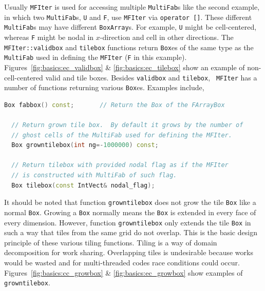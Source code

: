 {{{Usually {\tt MFIter} is used for accessing multiple {\tt MultiFab}s
like the second example, in which two {\tt MultiFab}s, {\tt U} and
{\tt F}, use {\tt MFIter} via {\tt operator []}.  These different {\tt
  MultiFab}s may have different {\tt BoxArray}s.  For example, {\tt U}
might be cell-centered, whereas {\tt F} might be nodal in
$x$-direction and cell in other directions.  The {\tt
  MFIter::validbox} and {\tt tilebox} functions return {\tt Box}es of
the same type as the {\tt MultiFab} used in defining the {\tt MFIter}
({\tt F} in this example).  Figures~\ref{fig:basics:ec_validbox} \&
\ref{fig:basics:ec_tilebox} show an example of non-cell-centered valid
and tile boxes.  Besides {\tt validbox} and {\tt tilebox}, {\tt
  MFIter} has a number of functions returning various {\tt Box}es.
Examples include,
\begin{lstlisting}[language=cpp]
  Box fabbox() const;       // Return the Box of the FArrayBox

  // Return grown tile box.  By default it grows by the number of
  // ghost cells of the MultiFab used for defining the MFIter.
  Box growntilebox(int ng=-1000000) const;

  // Return tilebox with provided nodal flag as if the MFIter
  // is constructed with MultiFab of such flag.
  Box tilebox(const IntVect& nodal_flag); 
\end{lstlisting} 
It should be noted that function {\tt growntilebox} does not grow the
tile {\tt Box} like a normal {\tt Box}.  Growing a {\tt Box} normally
means the {\tt Box} is extended in every face of every dimension.
However, function {\tt growntilebox} only extends the tile {\tt Box}
in such a way that tiles from the same grid do not overlap.  This is
the basic design principle of these various tiling functions.  Tiling
is a way of domain decomposition for work sharing.  Overlapping tiles
is undesirable because works would be wasted and for multi-threaded
codes race conditions could occur.
Figures~\ref{fig:basics:cc_growbox} \& \ref{fig:basics:ec_growbox}
show examples of {\tt growntilebox}.

}}}
